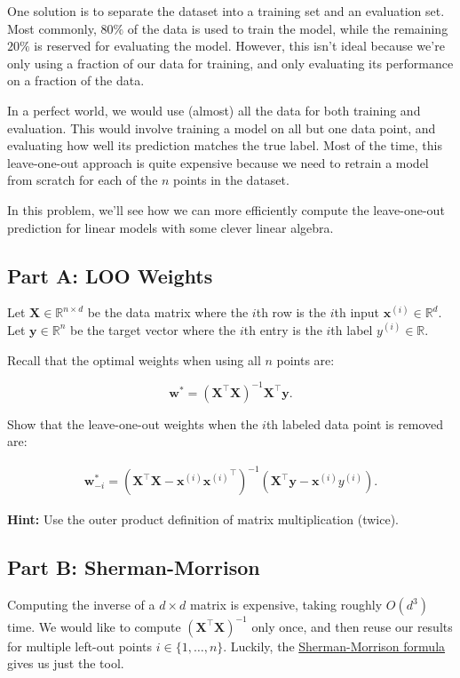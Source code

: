 \documentclass{article}
\begin{document}
One solution is to separate the dataset into a training set and an evaluation set.
Most commonly, $80\%$ of the data is used to train the model, while the remaining $20\%$ is reserved for evaluating the model.
However, this isn't ideal because we're only using a fraction of our data for training, and only evaluating its performance on a fraction of the data.

In a perfect world, we would use (almost) all the data for both training and evaluation.
This would involve training a model on all but one data point, and evaluating how well its prediction matches the true label.
Most of the time, this leave-one-out approach is quite expensive because we need to retrain a model from scratch for each of the $n$ points in the dataset.

In this problem, we'll see how we can more efficiently compute the leave-one-out prediction for linear models with some clever linear algebra.

\subsection*{Part A: LOO Weights}

Let $\mathbf{X} \in \mathbb{R}^{n \times d}$ be the data matrix where the $i$th row is the $i$th input $\mathbf{x}^{(i)} \in \mathbb{R}^d$.
Let $\mathbf{y} \in \mathbb{R}^n$ be the target vector where the $i$th entry is the $i$th label $y^{(i)} \in \mathbb{R}$.

Recall that the optimal weights when using all $n$ points are:

$$
\mathbf{w}^* = (\mathbf{X}^\top \mathbf{X})^{-1}
\mathbf{X}^\top \mathbf{y}.
$$

Show that the leave-one-out weights when the $i$th labeled data point is removed are:

\begin{align}
\mathbf{w}^*_{-i} 
= \left(\mathbf{X}^\top \mathbf{X} - {\mathbf{x}^{(i)}} {\mathbf{x}^{(i)}}^\top \right)^{-1}
\left(
\mathbf{X}^\top \mathbf{y}
- \mathbf{x}^{(i)} y^{(i)}
\right).
\end{align}

\textbf{Hint:} Use the outer product definition of matrix multiplication (twice).

\subsection*{Part B: Sherman-Morrison}

Computing the inverse of a $d \times d$ matrix is expensive, taking roughly $O(d^3)$ time.
We would like to compute $(\mathbf{X}^\top \mathbf{X})^{-1}$ only once, and then reuse our results for multiple left-out points $i \in \{1,\ldots, n\}$.
Luckily, the \href{https://en.wikipedia.org/wiki/Sherman%E2%80%93Morrison_formula}{Sherman-Morrison formula} gives us just the tool.
\end{document}
